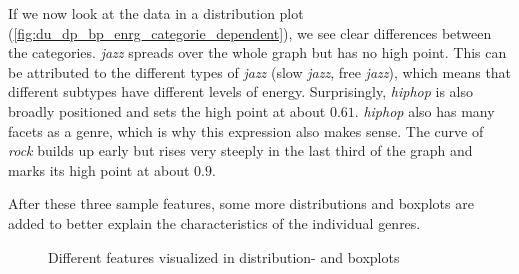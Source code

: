 If we now look at the data in a distribution plot (\ref{fig:du_dp_bp_enrg_categorie_dependent}),
we see clear differences between the categories.
\emph{jazz} spreads over the whole graph but has no high point.
This can be attributed to the different types of \emph{jazz} (slow \emph{jazz}, free \emph{jazz}),
which means that different subtypes have different levels of energy.
Surprisingly, \emph{hiphop} is also broadly positioned and sets the high point at about \(0.61\).
\emph{hiphop} also has many facets as a genre, which is why this expression also makes sense.
The curve of \emph{rock} builds up early but rises very steeply in the last third of the graph and marks
its high point at about \(0.9\). 

After these three sample features, some more distributions and boxplots are added to better
explain the characteristics of the individual genres.

\begin{figure}[H]
    \centering
    \qquad
    \qquad
    \label{fig:du_ds_bp_speechiness}%
\end{figure}

\begin{figure}[H]
    \centering
    \qquad
    \qquad
    \label{fig:du_ds_bp_danceability}%
\end{figure}

\begin{figure}[H]
    \centering
    \qquad
    \qquad
    \label{fig:du_ds_bp_accousticness}%
\end{figure}

\begin{figure}[H]
    \centering
    \qquad
    \qquad
    \caption{Different features visualized in distribution- and boxplots}%
    \label{fig:du_ds_bp_valence}%
\end{figure}